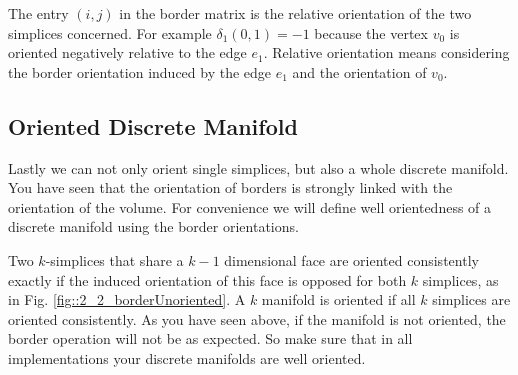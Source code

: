 The entry $(i,j)$ in the border matrix is the relative orientation of the two simplices concerned. For example $\delta_1(0,1) = -1$ because the vertex $v_0$ is oriented negatively relative to the edge $e_1$. Relative orientation means considering the border orientation induced by the edge $e_1$ and the orientation of $v_0$.


\subsection{Oriented Discrete Manifold}
\label{sec::2_orientedDiscreteMF}
Lastly we can not only orient single simplices, but also a whole discrete manifold. You have seen that the orientation of borders is strongly linked with the orientation of the volume. For convenience we will define well orientedness of a discrete manifold using the border orientations.

Two $k$-simplices that share a $k-1$ dimensional face are oriented consistently exactly if the induced orientation of this face is opposed for both $k$ simplices, as in Fig. \ref{fig::2_2_borderUnoriented}.
A $k$ manifold is oriented if all $k$ simplices are oriented consistently. As you have seen above, if the manifold is not oriented, the border operation will not be as expected. So make sure that in all implementations your discrete manifolds are well oriented.

